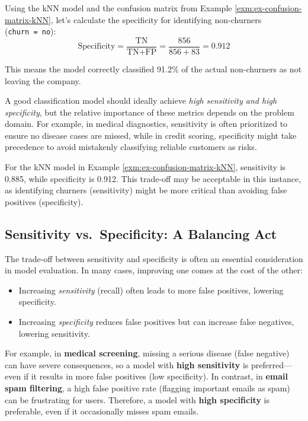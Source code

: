 \documentclass[
  11pt,
]{book}
\providecommand{\tightlist}{%
  \setlength{\itemsep}{0pt}\setlength{\parskip}{0pt}}
\theoremstyle{definition}
\theoremstyle{definition}
\theoremstyle{definition}
\theoremstyle{definition}
\theoremstyle{remark}
\begin{document}
Using the kNN model and the confusion matrix from Example \ref{exm:ex-confusion-matrix-kNN}, let's calculate the specificity for identifying non-churners (\texttt{churn\ =\ no}):\\
\[
\text{Specificity} = \frac{\text{TN}}{\text{TN} + \text{FP}} = \frac{856}{856 + 83} = 0.912
\]

This means the model correctly classified 91.2\% of the actual non-churners as not leaving the company.

A good classification model should ideally achieve \emph{high sensitivity and high specificity}, but the relative importance of these metrics depends on the problem domain. For example, in medical diagnostics, sensitivity is often prioritized to ensure no disease cases are missed, while in credit scoring, specificity might take precedence to avoid mistakenly classifying reliable customers as risks.

For the kNN model in Example \ref{exm:ex-confusion-matrix-kNN}, sensitivity is 0.885, while specificity is 0.912. This trade-off may be acceptable in this instance, as identifying churners (sensitivity) might be more critical than avoiding false positives (specificity).

\subsection*{Sensitivity vs.~Specificity: A Balancing Act}\label{sensitivity-vs.-specificity-a-balancing-act}


The trade-off between sensitivity and specificity is often an essential consideration in model evaluation. In many cases, improving one comes at the cost of the other:

\begin{itemize}
\tightlist
\item
  Increasing \emph{sensitivity} (recall) often leads to more false positives, lowering specificity.
\item
  Increasing \emph{specificity} reduces false positives but can increase false negatives, lowering sensitivity.
\end{itemize}

For example, in \textbf{medical screening}, missing a serious disease (false negative) can have severe consequences, so a model with \textbf{high sensitivity} is preferred---even if it results in more false positives (low specificity). In contrast, in \textbf{email spam filtering}, a high false positive rate (flagging important emails as spam) can be frustrating for users. Therefore, a model with \textbf{high specificity} is preferable, even if it occasionally misses spam emails.
\end{document}
